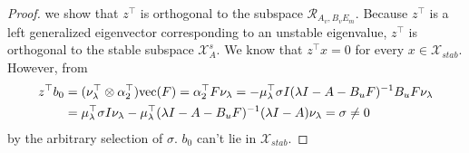 \begin{proof}
we show that \(z^\top\) is orthogonal to the subspace \(\mathcal{R}_{A_v,B_v E_m}\).
Because \(z^\top\) is a left generalized eigenvector corresponding to an unstable eigenvalue, \(z^\top\) is orthogonal to the stable subspace \(\mathcal{X}_A^s\). We know that \(z^\top x = 0\) for every \(x \in \mathcal{X}_{stab}\).
However, from
\begin{align*}
    z^\top b_0 & = (\nu_\lambda ^\top\otimes \alpha_2^\top){\mathrm{vec}}(F) = \alpha_2^\top F \nu_\lambda =  - \mu_\lambda^\top \sigma I (\lambda I -A -B_u F)^{-1} B_u F \nu_\lambda \\
    & = \mu_\lambda^\top \sigma I\nu_\lambda - \mu_\lambda^\top (\lambda I -A -B_u F)^{-1}(\lambda I -A) \nu_\lambda = \sigma \neq 0
\end{align*}
by the arbitrary selection of \(\sigma\).
\(b_0\) can't lie in \(\mathcal{X}_{stab}\).
\end{proof}

